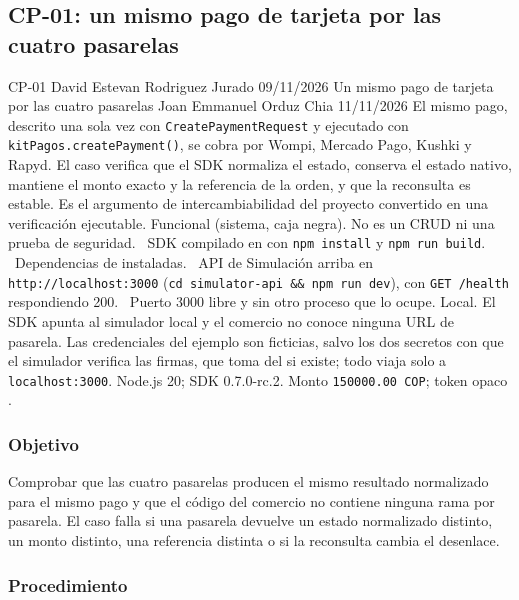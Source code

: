 \subsection{CP-01: un mismo pago de tarjeta por las cuatro pasarelas}
\label{sec:cp01}

\FichaCaso
  {CP-01}
  {David Estevan Rodriguez Jurado}
  {09/11/2026}
  {Un mismo pago de tarjeta por las cuatro pasarelas}
  {Joan Emmanuel Orduz Chia}
  {11/11/2026}
  {El mismo pago, descrito una sola vez con \texttt{CreatePaymentRequest} y ejecutado con \texttt{kitPagos.createPayment()}, se cobra por Wompi, Mercado Pago, Kushki y Rapyd. El caso verifica que el SDK normaliza el estado, conserva el estado nativo, mantiene el monto exacto y la referencia de la orden, y que la reconsulta es estable. Es el argumento de intercambiabilidad del proyecto convertido en una verificación ejecutable.}
  {Funcional (sistema, caja negra). No es un CRUD ni una prueba de seguridad.}
  {\textbullet\ SDK compilado en  con \texttt{npm install} y \texttt{npm run build}.\newline
   \textbullet\ Dependencias de  instaladas.\newline
   \textbullet\ API de Simulación arriba en \texttt{http://localhost:3000} (\texttt{cd simulator-api \&\& npm run dev}), con \texttt{GET /health} respondiendo 200.\newline
   \textbullet\ Puerto 3000 libre y sin otro proceso que lo ocupe.}
  {Local. El SDK apunta al simulador local y el comercio no conoce ninguna URL de pasarela. Las credenciales del ejemplo son ficticias, salvo los dos secretos con que el simulador verifica las firmas, que  toma del  si existe; todo viaja solo a \texttt{localhost:3000}. Node.js 20; SDK 0.7.0-rc.2. Monto \texttt{150000.00 COP}; token opaco .}

\subsubsection{Objetivo}

Comprobar que las cuatro pasarelas producen el mismo resultado normalizado para el mismo pago y que el código del comercio no contiene ninguna rama por pasarela. El caso falla si una pasarela devuelve un estado normalizado distinto, un monto distinto, una referencia distinta o si la reconsulta cambia el desenlace.

\subsubsection{Procedimiento}


